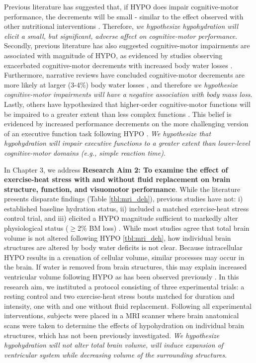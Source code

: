 Previous literature has suggested that, if HYPO does impair cognitive-motor performance, the decrements will be small - similar to the effect observed with other nutritional interventions \cite{masento_effects_2014}. Therefore, \textit{we hypothesize hypohydration will elicit a small, but significant, adverse affect on cognitive-motor performance}. Secondly, previous literature has also suggested cognitive-motor impairments are associated with magnitude of HYPO, as evidenced by studies observing exacerbated cognitive-motor decrements with increased body water losses  \cite{gopinathan_role_1988,sharma_influence_1986}. Furthermore, narrative reviews have concluded cognitive-motor decrements are more likely at larger (3-4\%) body water losses \cite{nuccio_fluid_2017}, and therefore \textit{we hypothesize cognitive-motor impairments will have a negative association with body mass loss}. Lastly, others have hypothesized that higher-order cognitive-motor functions will be impaired to a greater extent than less complex functions \cite{tomporowski_effects_2007,nuccio_fluid_2017}. This belief is evidenced by increased performance decrements on the more challenging version of an executive function task following HYPO \cite{tomporowski_effects_2007}. \textit{We hypothesize that hypohydration will impair executive functions to a greater extent than lower-level cognitive-motor domains (e.g., simple reaction time)}.


In Chapter 3, we address \textbf{Research Aim 2: To examine the effect of exercise-heat stress with and without fluid replacement on brain structure, function, and visuomotor performance}. While the literature presents disparate findings (Table \ref{tbl:mri_deh}), previous studies have not: i) established baseline hydration status, ii) included a matched exercise-heat stress control trial, and iii) elicited a HYPO magnitude sufficient to markedly alter physiological status (${\ge}$2\% BM loss) \cite{cheuvront_biological_2010}. While most studies agree that total brain volume is not altered following HYPO \ref{tbl:mri_deh}, how individual brain structures are altered by body water deficits is not clear. Because intracellular HYPO results in a crenation of cellular volume, similar processes may occur in the brain. If water is removed from brain structures, this may explain increased ventricular volume following HYPO as has been observed previously \cite{kempton_dehydration_2011,kempton_effects_2009}. In this research aim, we instituted a protocol consisting of three experimental trials: a resting control and two exercise-heat stress bouts matched for duration and intensity, one with and one without fluid replacement. Following all experimental interventions, subjects were placed in a MRI scanner where brain anatomical scans were taken to determine the effects of hypohydration on individual brain structures, which has not been previously investigated. \textit{We hypothesize hypohydration will not alter total brain volume, will induce expansion of ventricular system while decreasing volume of the surrounding structures}. 

